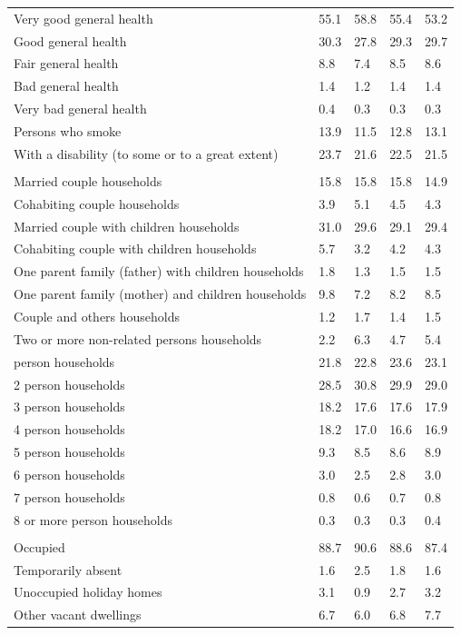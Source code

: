\documentclass{article}
\begin{document}
\begin{table}[h]
\begin{tabular}{KTTTT}
    \hline
Very good general health & 55.1& 58.8&55.4& 53.2\\
Good general health & 30.3& 27.8& 29.3& 29.7\\
Fair general health & 8.8& 7.4&8.5& 8.6\\
Bad general health & 1.4& 1.2&1.4& 1.4\\
Very bad general health & 0.4& 0.3&0.3& 0.3\\
    \hline
Persons who smoke & 13.9& 11.5&12.8& 13.1\\
    \hline
With a disability (to some or to a great extent) & 23.7& 21.6&22.5& 21.5\\
\hline
    \\ 
    \hline
Married couple households & 15.8& 15.8& 15.8& 14.9\\
Cohabiting couple households & 3.9& 5.1& 4.5& 4.3\\
Married couple with children households & 31.0& 29.6& 29.1& 29.4\\
Cohabiting couple with children households & 5.7& 3.2& 4.2& 4.3\\
One parent family (father) with  children households & 1.8& 1.3& 1.5& 1.5\\
One parent family (mother) and children households & 9.8& 7.2& 8.2& 8.5\\
Couple and others households  & 1.2& 1.7& 1.4& 1.5\\
Two or more non-related persons households & 2.2& 6.3& 4.7& 5.4\\
     person households & 21.8& 22.8& 23.6& 23.1\\
2 person households & 28.5& 30.8& 29.9& 29.0\\
3 person households & 18.2& 17.6& 17.6& 17.9\\
4 person households & 18.2& 17.0& 16.6& 16.9\\
5 person households & 9.3& 8.5& 8.6& 8.9\\
6 person households & 3.0& 2.5& 2.8& 3.0\\
7 person households & 0.8& 0.6& 0.7& 0.8\\
8 or more person households & 0.3& 0.3& 0.3& 0.4\\
\hline
    \\ 
    \hline
Occupied & 88.7& 90.6& 88.6& 87.4\\
Temporarily absent & 1.6& 2.5& 1.8& 1.6\\
Unoccupied holiday homes & 3.1& 0.9& 2.7& 3.2\\
Other vacant dwellings & 6.7& 6.0& 6.8& 7.7\\
\hline
\end{tabular}
\end{table}
\end{document}
